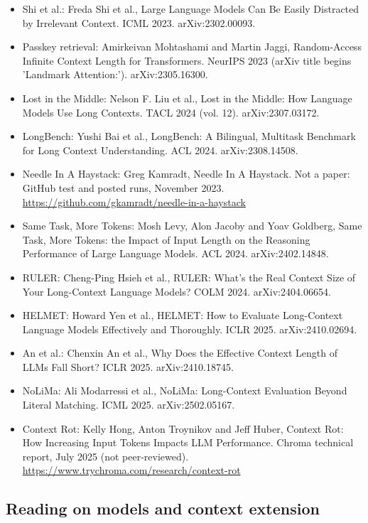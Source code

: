 \begin{itemize}[leftmargin=*]
\item Shi et al.: Freda Shi et al., Large Language Models Can Be Easily Distracted by Irrelevant Context. ICML 2023. arXiv:2302.00093.
\item Passkey retrieval: Amirkeivan Mohtashami and Martin Jaggi, Random-Access Infinite Context Length for Transformers. NeurIPS 2023 (arXiv title begins 'Landmark Attention:'). arXiv:2305.16300.
\item Lost in the Middle: Nelson F. Liu et al., Lost in the Middle: How Language Models Use Long Contexts. TACL 2024 (vol. 12). arXiv:2307.03172.
\item LongBench: Yushi Bai et al., LongBench: A Bilingual, Multitask Benchmark for Long Context Understanding. ACL 2024. arXiv:2308.14508.
\item Needle In A Haystack: Greg Kamradt, Needle In A Haystack. Not a paper: GitHub test and posted runs, November 2023. \url{https://github.com/gkamradt/needle-in-a-haystack}
\item Same Task, More Tokens: Mosh Levy, Alon Jacoby and Yoav Goldberg, Same Task, More Tokens: the Impact of Input Length on the Reasoning Performance of Large Language Models. ACL 2024. arXiv:2402.14848.
\item RULER: Cheng-Ping Hsieh et al., RULER: What's the Real Context Size of Your Long-Context Language Models? COLM 2024. arXiv:2404.06654.
\item HELMET: Howard Yen et al., HELMET: How to Evaluate Long-Context Language Models Effectively and Thoroughly. ICLR 2025. arXiv:2410.02694.
\item An et al.: Chenxin An et al., Why Does the Effective Context Length of LLMs Fall Short? ICLR 2025. arXiv:2410.18745.
\item NoLiMa: Ali Modarressi et al., NoLiMa: Long-Context Evaluation Beyond Literal Matching. ICML 2025. arXiv:2502.05167.
\item Context Rot: Kelly Hong, Anton Troynikov and Jeff Huber, Context Rot: How Increasing Input Tokens Impacts LLM Performance. Chroma technical report, July 2025 (not peer-reviewed). \url{https://www.trychroma.com/research/context-rot}
\end{itemize}

\subsection{Reading on models and context extension}
\label{sec:it-R-models}

